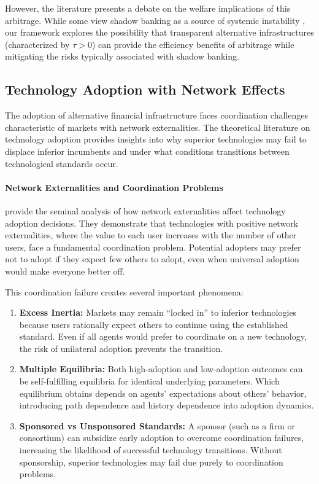 However, the literature presents a debate on the welfare implications of this arbitrage. While some view shadow banking as a source of systemic instability \cite{gorton_regulating_2010}, our framework explores the possibility that transparent alternative infrastructures (characterized by $\tau > 0$) can provide the efficiency benefits of arbitrage while mitigating the risks typically associated with shadow banking.

\subsection{Technology Adoption with Network Effects}

The adoption of alternative financial infrastructure faces coordination challenges characteristic of markets with network externalities. The theoretical literature on technology adoption provides insights into why superior technologies may fail to displace inferior incumbents and under what conditions transitions between technological standards occur.

\paragraph{Network Externalities and Coordination Problems}

 provide the seminal analysis of how network externalities affect technology adoption decisions. They demonstrate that technologies with positive network externalities, where the value to each user increases with the number of other users, face a fundamental coordination problem. Potential adopters may prefer not to adopt if they expect few others to adopt, even when universal adoption would make everyone better off.

This coordination failure creates several important phenomena:

\begin{enumerate}
    \item \textbf{Excess Inertia:} Markets may remain ``locked in'' to inferior technologies because users rationally expect others to continue using the established standard. Even if all agents would prefer to coordinate on a new technology, the risk of unilateral adoption prevents the transition.
    
    \item \textbf{Multiple Equilibria:} Both high-adoption and low-adoption outcomes can be self-fulfilling equilibria for identical underlying parameters. Which equilibrium obtains depends on agents' expectations about others' behavior, introducing path dependence and history dependence into adoption dynamics.
    
    \item \textbf{Sponsored vs Unsponsored Standards:} A sponsor (such as a firm or consortium) can subsidize early adoption to overcome coordination failures, increasing the likelihood of successful technology transitions. Without sponsorship, superior technologies may fail due purely to coordination problems.
\end{enumerate}

